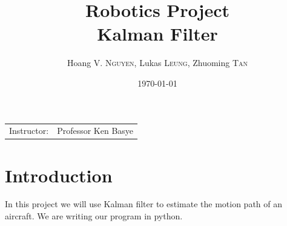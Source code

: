 \documentclass[12pt]{article}
\title{Robotics Project \\ Kalman Filter} %
\author{Hoang V. \textsc{Nguyen}, Lukas \textsc{Leung}, Zhuoming \textsc{Tan}} %
\date{\today} %
\begin{document}
	\maketitle %

	\begin{center}
		\begin{tabular}{l r}
			Instructor: & Professor Ken Basye \\ %
		\end{tabular}
	\end{center}





	\section{Introduction}\label{sec:intro}

	In this project we will use Kalman filter to estimate the motion path of an aircraft. We are writing our program in python.
\end{document}
